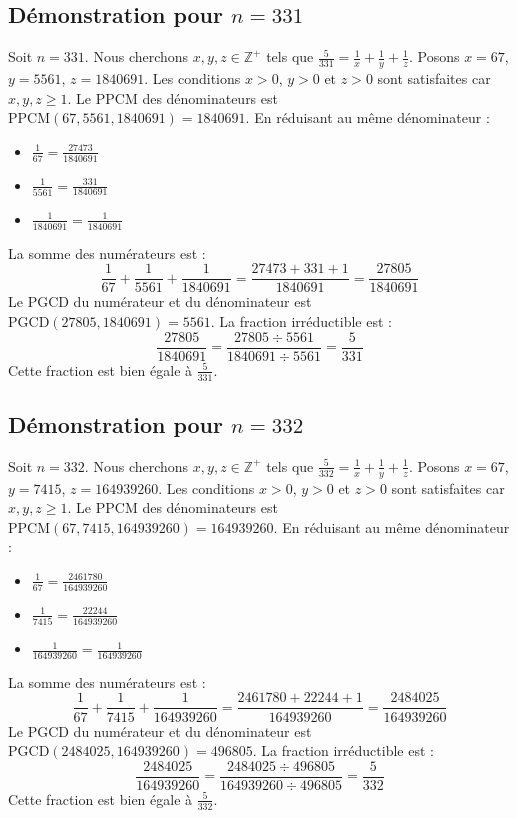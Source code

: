 \documentclass[11pt,a4paper]{article}
\begin{document}
\subsection{Démonstration pour $n = 331$}
Soit $n = 331$. Nous cherchons $x, y, z \in \mathbb{Z}^{+}$ tels que $\frac{5}{331} = \frac{1}{x} + \frac{1}{y} + \frac{1}{z}$.
Posons $x = 67$, $y = 5561$, $z = 1840691$.
Les conditions $x > 0$, $y > 0$ et $z > 0$ sont satisfaites car $x, y, z \geq 1$.
Le PPCM des dénominateurs est $\text{PPCM}(67, 5561, 1840691) = 1840691$.
En réduisant au même dénominateur :
\begin{itemize}
    \item $\frac{1}{67} = \frac{27473}{1840691}$
    \item $\frac{1}{5561} = \frac{331}{1840691}$
    \item $\frac{1}{1840691} = \frac{1}{1840691}$
\end{itemize}
La somme des numérateurs est :
$$ \frac{1}{67} + \frac{1}{5561} + \frac{1}{1840691} = \frac{27473 + 331 + 1}{1840691} = \frac{27805}{1840691} $$
Le PGCD du numérateur et du dénominateur est $\text{PGCD}(27805, 1840691) = 5561$.
La fraction irréductible est :
$$ \frac{27805}{1840691} = \frac{27805 \div 5561}{1840691 \div 5561} = \frac{5}{331} $$
Cette fraction est bien égale à $\frac{5}{331}$.

\subsection{Démonstration pour $n = 332$}
Soit $n = 332$. Nous cherchons $x, y, z \in \mathbb{Z}^{+}$ tels que $\frac{5}{332} = \frac{1}{x} + \frac{1}{y} + \frac{1}{z}$.
Posons $x = 67$, $y = 7415$, $z = 164939260$.
Les conditions $x > 0$, $y > 0$ et $z > 0$ sont satisfaites car $x, y, z \geq 1$.
Le PPCM des dénominateurs est $\text{PPCM}(67, 7415, 164939260) = 164939260$.
En réduisant au même dénominateur :
\begin{itemize}
    \item $\frac{1}{67} = \frac{2461780}{164939260}$
    \item $\frac{1}{7415} = \frac{22244}{164939260}$
    \item $\frac{1}{164939260} = \frac{1}{164939260}$
\end{itemize}
La somme des numérateurs est :
$$ \frac{1}{67} + \frac{1}{7415} + \frac{1}{164939260} = \frac{2461780 + 22244 + 1}{164939260} = \frac{2484025}{164939260} $$
Le PGCD du numérateur et du dénominateur est $\text{PGCD}(2484025, 164939260) = 496805$.
La fraction irréductible est :
$$ \frac{2484025}{164939260} = \frac{2484025 \div 496805}{164939260 \div 496805} = \frac{5}{332} $$
Cette fraction est bien égale à $\frac{5}{332}$.
\end{document}
